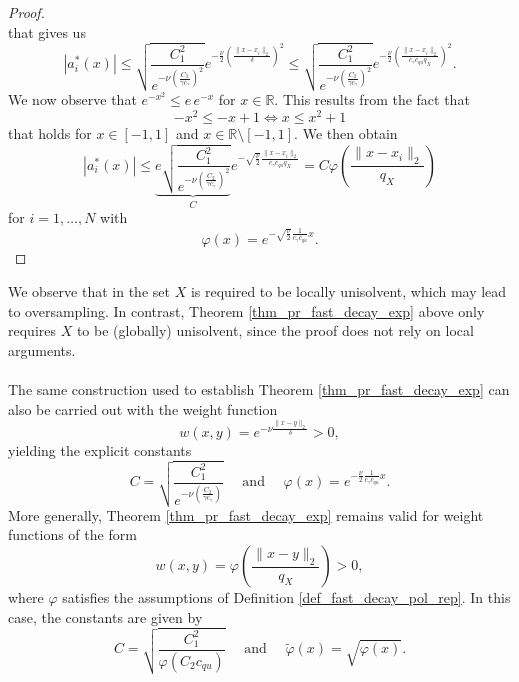 \documentclass{drna}
\begin{document}
\begin{proof}
\begin{equation*}
\end{equation*}
that gives us
\begin{equation*}
    |a_{i}^{*}(x)| \leq \sqrt{\frac{C_1^2}{e^{-\nu \left(\frac{C_2}{\gamma c_\gamma}\right)^2}} } e^{-\frac{\nu}{2} \left(\frac{\|x-x_i\|_2}{\delta}\right)^2} \leq \sqrt{\frac{C_1^2}{e^{-\nu \left(\frac{C_2}{\gamma c_\gamma}\right)^2}}} e^{-\frac{\nu}{2} \left(\frac{\|x-x_i\|_2}{c_\gamma c_{qu} q_X}\right)^2}.
\end{equation*}
We now observe that $e^{-x^2} \leq e\, e^{-x}$ for $x \in \mathbb{R}$. This results from the fact that
\begin{equation*}
    -x^2 \leq -x +1 \Longleftrightarrow x \leq x^2 +1
\end{equation*}
that holds for $x \in [-1,1]$ and $x \in \mathbb{R} \setminus [-1,1]$. We then obtain
\begin{equation}
    |a_{i}^{*}(x)| \leq \underbrace{e \sqrt{\frac{C_1^2}{e^{-\nu \left(\frac{C_2}{\gamma c_\gamma}\right)^2}}}}_{C} e^{-\sqrt{\frac{\nu}{2}} \frac{\|x-x_i\|_2}{c_\gamma c_{qu} q_X}} = C\varphi \left( \frac{\|x-x_i\|_2}{q_X}\right)
    \label{eq_computation_proof_mls_1}
\end{equation} 
for $i=1,\dots,N$ with
\begin{equation*}
    \varphi(x) = e^{-\sqrt{\frac{\nu}{2}} \frac{1}{c_\gamma c_{qu}}x}.
\end{equation*}
\end{proof}
\noindent We observe that in \cite[Theorem 4.7]{wendland_2004} the set $X$ is required to be locally unisolvent, which may lead to oversampling. In contrast, Theorem \ref{thm_pr_fast_decay_exp} above only requires $X$ to be (globally) unisolvent, since the proof does not rely on local arguments.
\\
\\
The same construction used to establish Theorem \ref{thm_pr_fast_decay_exp} can also be carried out with the weight function 
\begin{equation*}
    w(x,y) = e^{-\nu \frac{\|x-y\|_2}{\delta}}>0,
\end{equation*}
yielding the explicit constants
\begin{equation}
    C = \sqrt{\frac{C_1^2}{e^{-\nu \left(\frac{C_2}{\gamma c_\gamma}\right)}}} \quad \textrm{ and } \quad \varphi(x) = e^{-\frac{\nu}{2} \frac{1}{c_\gamma c_{qu}}x}.
    \label{eq_stability_fast_decay_choose_delta}
\end{equation}
More generally, Theorem \ref{thm_pr_fast_decay_exp} remains valid for weight functions of the form
\begin{equation*}
    w(x,y)=\varphi \left(\frac{\|x-y\|_2}{q_X}\right)>0,
\end{equation*}
where $\varphi$ satisfies the assumptions of Definition \ref{def_fast_decay_pol_rep}. In this case, the constants are given by
\begin{equation}
    C = \sqrt{\frac{C_1^2}{\varphi( C_2 c_{qu})} } \quad \textrm{ and } \quad \widetilde{\varphi}(x) = \sqrt{\varphi(x)}.
    \label{eq_general_phi_weight_mls}
\end{equation}
\end{document}

